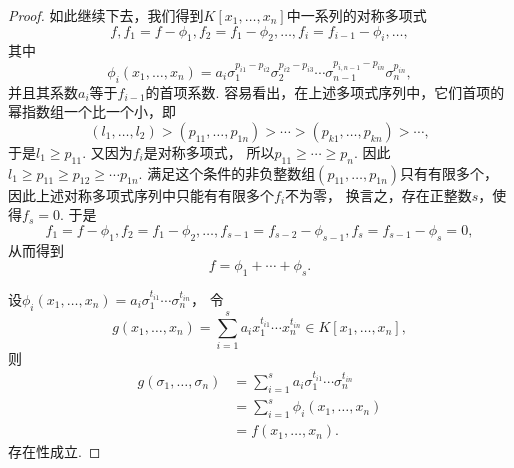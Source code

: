 \begin{theorem}[对称多项式基本定理]
\begin{proof}
如此继续下去，我们得到\(K[x_1,\dotsc,x_n]\)中一系列的对称多项式\begin{equation*}
	f,
	f_1=f-\phi_1,
	f_2=f_1-\phi_2,
	\dotsc,
	f_i=f_{i-1}-\phi_i,
	\dotsc,
\end{equation*}
其中\begin{equation*}
	\phi_i(x_1,\dotsc,x_n)
	=a_i \sigma_1^{p_{i1}-p_{i2}} \sigma_2^{p_{i2}-p_{i3}}
	\dotsm \sigma_{n-1}^{p_{i,n-1}-p_{in}} \sigma_n^{p_{in}},
\end{equation*}
并且其系数\(a_i\)等于\(f_{i-1}\)的首项系数.
容易看出，在上述多项式序列中，它们首项的幂指数组一个比一个小，即\begin{equation*}
	(l_1,\dotsc,l_2)
	>(p_{11},\dotsc,p_{1n})
	>\dotsb
	>(p_{k1},\dotsc,p_{kn})
	>\dotsb,
\end{equation*}
于是\(l_1 \geq p_{11}\).
又因为\(f_i\)是对称多项式，
所以\(p_{11} \geq \dotsb \geq p_n\).
因此\(l_1 \geq p_{11} \geq p_{12} \geq \dotsb p_{1n}\).
满足这个条件的非负整数组\((p_{11},\dotsc,p_{1n})\)只有有限多个，
因此上述对称多项式序列中只能有有限多个\(f_i\)不为零，
换言之，存在正整数\(s\)，使得\(f_s=0\).
于是\begin{equation*}
	f_1=f-\phi_1,
	f_2=f_1-\phi_2,
	\dotsc,
	f_{s-1}=f_{s-2}-\phi_{s-1},
	f_s=f_{s-1}-\phi_s=0,
\end{equation*}
从而得到\begin{equation*}
	f=\phi_1+\dotsb+\phi_s.
\end{equation*}

设\(\phi_i(x_1,\dotsc,x_n)
=a_i \sigma_1^{t_{i1}} \dotsm \sigma_n^{t_{in}}\)，
令\begin{equation*}
	g(x_1,\dotsc,x_n)
	=\sum_{i=1}^s a_i x_1^{t_{i1}} \dotsm x_n^{t_{in}}
	\in K[x_1,\dotsc,x_n],
\end{equation*}
则\begin{align*}
	g(\sigma_1,\dotsc,\sigma_n)
	&=\sum_{i=1}^s a_i \sigma_1^{t_{i1}} \dotsm \sigma_n^{t_{in}} \\
	&=\sum_{i=1}^s \phi_i(x_1,\dotsc,x_n) \\
	&=f(x_1,\dotsc,x_n).
\end{align*}
存在性成立.


\end{proof}
\end{theorem}
